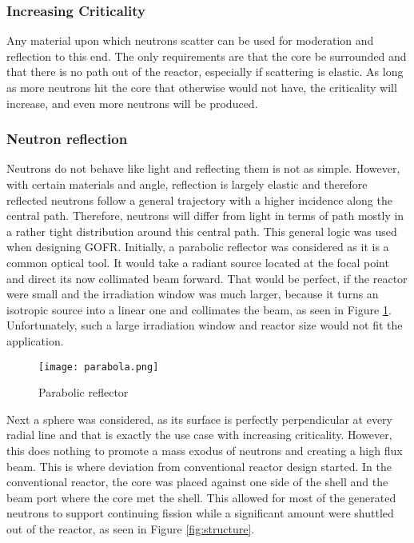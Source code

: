 \subsubsection{Increasing Criticality}

Any material upon which neutrons scatter can be used for moderation and reflection to this end. The only requirements are that the core be surrounded and that there is no path out of the reactor, especially if scattering is elastic. As long as more neutrons hit the core that otherwise would not have, the criticality will increase, and even more neutrons will be produced.

\subsubsection{Neutron reflection}

Neutrons do not behave like light and reflecting them is not as simple. However, with certain materials and angle, reflection is largely elastic and therefore reflected neutrons follow a general trajectory with a higher incidence along the central path. Therefore, neutrons will differ from light in terms of path mostly in a rather tight distribution around this central path. This general logic was used when designing GOFR.
Initially, a parabolic reflector was considered as it is a common optical tool. It would take a radiant source located at the focal point and direct its now collimated beam forward. That would be perfect, if the reactor were small and the irradiation window was much larger, because it turns an isotropic source into a linear one and collimates the beam, as seen in Figure \ref{fig:parabola}. Unfortunately, such a large irradiation window and reactor size would not fit the application. 

\begin{figure}[!htbp]
\centering
\texttt{[image: parabola.png]}
\caption{Parabolic reflector}
\label{fig:parabola}
\end{figure}

Next a sphere was considered, as its surface is perfectly perpendicular at every radial line and that is exactly the use case with increasing criticality. However, this does nothing to promote a mass exodus of neutrons and creating a high flux beam. This is where deviation from conventional reactor design started. In the conventional reactor, the core was placed against one side of the shell and the beam port where the core met the shell. This allowed for most of the generated neutrons to support continuing fission while a significant amount were shuttled out of the reactor, as seen in Figure \ref{fig:structure}.

